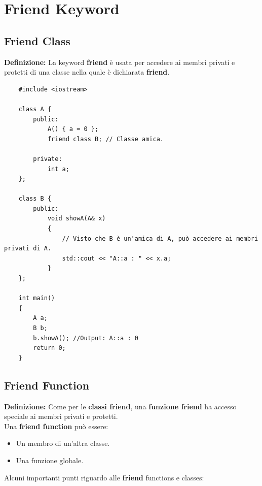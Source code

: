 
\newpage

\section{Friend Keyword}

\subsection{Friend Class}

\textsf{\small \textbf{Definizione: } La keyword \textbf{friend} è usata per accedere ai membri privati e protetti di una classe nella quale è dichiarata \textbf{friend}.} \\

\begin{lstlisting}
	#include <iostream>
	
	class A {
		public:
			A() { a = 0 };
			friend class B; // Classe amica.
			
		private:
			int a;
	};

	class B {
		public:
			void showA(A& x)
			{
				// Visto che B è un'amica di A, può accedere ai membri privati di A.
				std::cout << "A::a : " << x.a; 
			}
	};

	int main()
	{
		A a;
		B b;
		b.showA(); //Output: A::a : 0
		return 0;
	}
\end{lstlisting}

\subsection{Friend Function}

\textsf{\small \textbf{Definizione: } Come per le \textbf{classi friend}, una \textbf{funzione friend} ha accesso speciale ai membri privati e protetti.} \\

\textsf{\small Una \textbf{friend function} può essere: } \\

\begin{itemize}
	\item \textsf{\small Un membro di un'altra classe.}
	\item \textsf{\small Una funzione globale.}
\end{itemize}

\textsf{\small Alcuni importanti punti riguardo alle \textbf{friend} functions e classes: } \\

